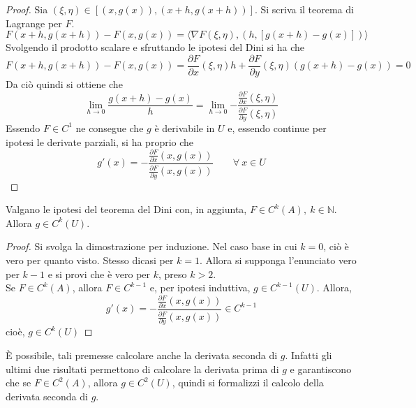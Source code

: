 \begin{proof}
Sia $(\xi, \eta) \in \left[(x, g(x)), (x+h, g(x+h)) \right]$.
Si scriva il teorema di Lagrange per $F$.
\begin{equation*}
    F(x+h, g(x+h))-F(x, g(x)) =\langle \nabla F (\xi, \eta), (h, [g(x+h)-g(x)]) \rangle
\end{equation*}
Svolgendo il prodotto scalare e sfruttando le ipotesi del Dini si ha che
\begin{equation*}
    F(x+h, g(x+h))-F(x, g(x))= \frac{\partial {F}}{\partial{x}}(\xi, \eta) h + \frac{\partial {F}}{\partial{y}}(\xi, \eta) (g(x+h)-g(x))=0
\end{equation*}
    Da ciò quindi si ottiene che
    \begin{equation*}
        \lim_{h \to 0}{\frac{g(x+h)-g(x)}{h}}=\lim_{h \to 0}{-\frac{\frac{\partial {F}}{\partial{x}}(\xi, \eta)}{\frac{\partial {F}}{\partial{y}}(\xi, \eta)}}
    \end{equation*}
Essendo $F \in C^1$ ne consegue che $g$ è derivabile in $U$ e, essendo continue per ipotesi le derivate parziali, si ha proprio che
\begin{equation*}
    g'(x)=-\frac{\frac{\partial{F}}{\partial{x}}(x, g(x))}{\frac{\partial{F}}{\partial{y}}(x, g(x))} \qquad \forall\ x \in U
\end{equation*}
\end{proof}
\begin{corollary}
    Valgano le ipotesi del teorema del Dini con, in aggiunta, $F \in C^k(A),\ k \in \mathbb{N}$. Allora $g \in C^k(U)$.
\end{corollary}
\begin{proof}
    Si svolga la dimostrazione per induzione.
    Nel caso base in cui $k=0$, ciò è vero per quanto visto. Stesso dicasi per $k=1$. Allora si supponga l'enunciato vero per $k-1$ e si provi che è vero per $k$, preso $k>2$.\\
    Se $F \in C^k(A)$, allora $F \in C^{k-1}$ e, per ipotesi induttiva, $g \in C^{k-1}(U)$. Allora, 
    \begin{equation*}
         g'(x)=-\frac{\frac{\partial{F}}{\partial{x}}(x, g(x))}{\frac{\partial{F}}{\partial{y}}(x, g(x))} \in C^{k-1}
    \end{equation*}
    cioè, $g \in C^k(U)$
\end{proof}
È possibile, tali premesse calcolare anche la derivata seconda di $g$. Infatti gli ultimi due risultati permettono di calcolare la derivata prima di $g$ e garantiscono che se $F \in C^2(A)$, allora $g \in C^2(U)$, quindi si formalizzi il calcolo della derivata seconda di $g$.

